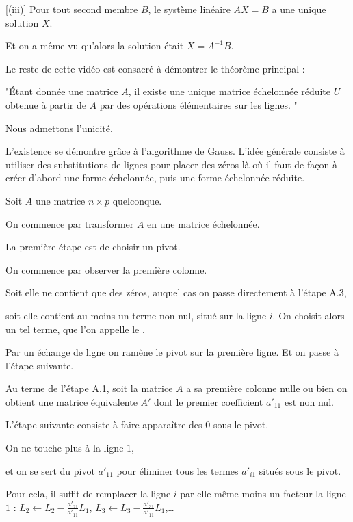 [(iii)] Pour tout second membre $B$, le système linéaire $AX=B$
  a une unique solution $X$.
  
  Et on a même vu qu'alors la solution était $X=A^{-1}B$.

\diapo

Le reste de cette vidéo est consacré à démontrer le théorème principal :

"\'Etant donnée une matrice $A$, il existe une unique  
matrice échelonnée réduite $U$ obtenue à partir de $A$ 
par des opérations élémentaires sur les lignes. "


Nous admettons l'unicité.

L'existence se démontre grâce à l'algorithme de Gauss. 
L'idée générale consiste à utiliser des substitutions de
lignes pour placer des zéros là où il faut de façon à 
créer d'abord une forme échelonnée, puis une forme
échelonnée réduite. 


\diapo

Soit $A$ une matrice $n\times p$ quelconque.

On commence par transformer $A$ en une matrice échelonnée.

\change
La première étape est de choisir un pivot.

\change
On commence par observer la première colonne. 

Soit elle ne contient que des zéros, auquel cas on passe directement à l'étape A.3, 

\change
soit elle contient au moins un terme non nul, situé sur la ligne $i$. 
On choisit alors un tel terme, que l'on appelle le . 

\change
Par un échange de ligne on ramène le pivot sur la première ligne. Et on passe à l'étape suivante.

\change
Au terme de l'étape A.1, soit la matrice $A$ a sa première colonne nulle 
ou bien on obtient une matrice équivalente $A'$ dont le premier coefficient $a'_{11}$ est non nul.


\change
L'étape suivante consiste à faire apparaître des $0$ sous le pivot.

\change
On ne touche plus à la ligne $1$, 

\change
et on se sert du pivot $a'_{11}$
pour éliminer tous les termes $a'_{i1}$  situés sous le pivot.

\change
Pour cela, il suffit de remplacer la ligne $i$ par 
elle-même moins un facteur la ligne $1$ :
$L_2 \leftarrow L_2 - \frac{a'_{21}}{a'_{11}}L_1$, 
$L_3 \leftarrow L_3 - \frac{a'_{31}}{a'_{11}}L_1$,\ldots 

